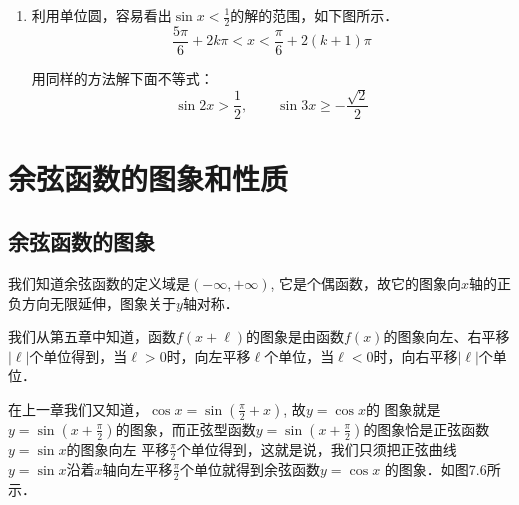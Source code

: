 \begin{enumerate}
\item 利用单位圆，容易看出$\sin x<\frac{1}{2}$的解的范围，如下图所示．
\[\frac{5\pi}{6}+2k\pi<x<\frac{\pi}{6}+2(k+1)\pi\]
\begin{center}
\end{center}


用同样的方法解下面不等式：
\[\sin 2x>\frac{1}{2},\qquad \sin 3x\ge -\frac{\sqrt{2}}{2}\]
\end{enumerate}  

\section{余弦函数的图象和性质}
\subsection{余弦函数的图象}

我们知道余弦函数的定义域是$(-\infty,+\infty)$, 它是个偶函数，故它的图象向$x$轴的正负方向无限延伸，图象关于$y$轴对称．

我们从第五章中知道，函数$f(x+\ell)$的图象是由函数$f(x)$的图象向左、右平移$|\ell|$个单位得到，当$\ell>0$时，向左平移$\ell$个单位，当$\ell<0$时，向右平移$|\ell|$个单位．

在上一章我们又知道，$\cos x=\sin\left(\frac{\pi}{2}+x\right)$,
故$y=\cos x$的
图象就是$y=\sin\left(x+\frac{\pi}{2}\right)$的图象，而正弦型函数$y=\sin\left(x+\frac{\pi}{2}\right)$的图象恰是正弦函数$y=\sin x$的图象向左
平移$\frac{\pi}{2}$个单位得到，这就是说，我们只须把正弦曲线
$y=\sin x$沿着$x$轴向左平移$\frac{\pi}{2}$个单位就得到余弦函数$y=\cos x$
的图象．如图7.6所示．

